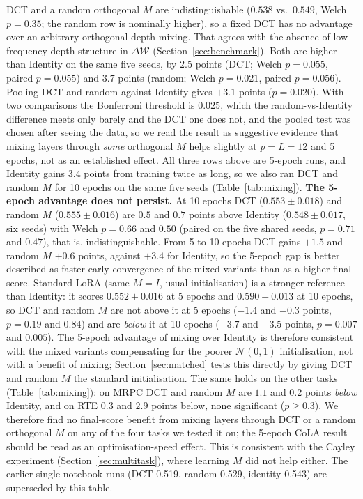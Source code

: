\documentclass{article}
\newcommand{\DeltaW}{\Delta\mathcal{W}}
\theoremstyle{plain}
\begin{document}
\noindent
DCT and a random orthogonal $M$ are indistinguishable ($0.538$ vs.\ $0.549$, Welch $p=0.35$; the random row is nominally higher),
so a fixed DCT has no advantage over an arbitrary orthogonal depth mixing.
That agrees with the absence of low-frequency depth structure in $\DeltaW$ (Section~\ref{sec:benchmark}).
Both are higher than Identity on the same five seeds, by $2.5$ points (DCT; Welch $p=0.055$, paired $p=0.055$) and $3.7$ points
(random; Welch $p=0.021$, paired $p=0.056$).
Pooling DCT and random against Identity gives $+3.1$ points ($p=0.020$).
With two comparisons the Bonferroni threshold is $0.025$, which the random-vs-Identity difference meets only barely and the DCT one does not,
and the pooled test was chosen after seeing the data, so we read the result as suggestive evidence that mixing layers through \emph{some}
orthogonal $M$ helps slightly at $p=L=12$ and 5 epochs, not as an established effect.
All three rows above are 5-epoch runs, and Identity gains $3.4$ points from training twice as long, so we also ran DCT and random $M$
for 10 epochs on the same five seeds (Table~\ref{tab:mixing}).
\textbf{The 5-epoch advantage does not persist.}
At 10 epochs DCT ($0.553\pm0.018$) and random $M$ ($0.555\pm0.016$) are $0.5$ and $0.7$ points above Identity ($0.548\pm0.017$, six seeds)
with Welch $p=0.66$ and $0.50$ (paired on the five shared seeds, $p=0.71$ and $0.47$), that is, indistinguishable.
From 5 to 10 epochs DCT gains $+1.5$ and random $M$ $+0.6$ points, against $+3.4$ for Identity, so the 5-epoch gap is better described as
faster early convergence of the mixed variants than as a higher final score.
Standard LoRA (same $M=I$, usual initialisation) is a stronger reference than Identity: it scores $0.552\pm0.016$ at 5 epochs and $0.590\pm0.013$ at 10 epochs,
so DCT and random $M$ are not above it at 5 epochs ($-1.4$ and $-0.3$ points, $p=0.19$ and $0.84$) and are \emph{below} it at 10 epochs
($-3.7$ and $-3.5$ points, $p=0.007$ and $0.005$).
The 5-epoch advantage of mixing over Identity is therefore consistent with the mixed variants compensating for the poorer $\mathcal{N}(0,1)$ initialisation, not with a benefit of mixing;
Section~\ref{sec:matched} tests this directly by giving DCT and random $M$ the standard initialisation.
The same holds on the other tasks (Table~\ref{tab:mixing}): on MRPC DCT and random $M$ are $1.1$ and $0.2$ points \emph{below} Identity, and on RTE
$0.3$ and $2.9$ points below, none significant ($p\ge0.3$).
We therefore find no final-score benefit from mixing layers through DCT or a random orthogonal $M$ on any of the four tasks we tested it on;
the 5-epoch CoLA result should be read as an optimisation-speed effect.
This is consistent with the Cayley experiment (Section~\ref{sec:multitask}), where learning $M$ did not help either.
The earlier single notebook runs (DCT 0.519, random 0.529, identity 0.543) are superseded by this table.
\end{document}
